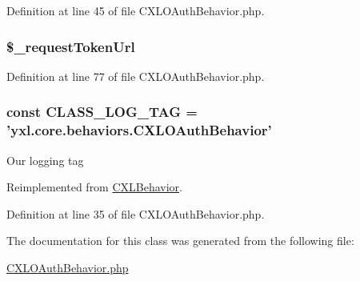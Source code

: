 Definition at line 45 of file CXLOAuthBehavior.php.

\hypertarget{classCXLOAuthBehavior_a78f914fceb757ea6ceeefd223aa94245}{
\subsubsection[{\$\_\-requestTokenUrl}]{\setlength{\rightskip}{0pt plus 5cm}\$\_\-requestTokenUrl}}
\label{classCXLOAuthBehavior_a78f914fceb757ea6ceeefd223aa94245}


Definition at line 77 of file CXLOAuthBehavior.php.

\hypertarget{classCXLOAuthBehavior_aa607ab5e557e6ebb60b85c5a20ad067f}{
\subsubsection[{CLASS\_\-LOG\_\-TAG}]{\setlength{\rightskip}{0pt plus 5cm}const {\bf CLASS\_\-LOG\_\-TAG} = 'yxl.core.behaviors.CXLOAuthBehavior'}}
\label{classCXLOAuthBehavior_aa607ab5e557e6ebb60b85c5a20ad067f}
Our logging tag 

Reimplemented from \hyperlink{classCXLBehavior_aa607ab5e557e6ebb60b85c5a20ad067f}{CXLBehavior}.



Definition at line 35 of file CXLOAuthBehavior.php.



The documentation for this class was generated from the following file:\begin{DoxyCompactItemize}
\item 
\hyperlink{CXLOAuthBehavior_8php}{CXLOAuthBehavior.php}\end{DoxyCompactItemize}
